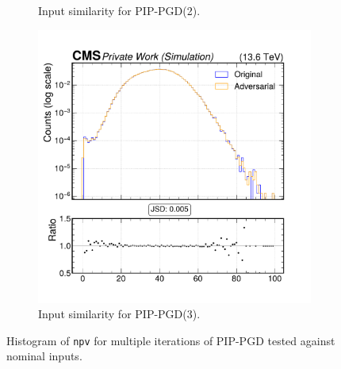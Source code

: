 \begin{figure}[htbp]
\begin{subfigure}[t]{0.32\textwidth}
    \caption*{Input similarity for PIP-PGD(2).}
  \end{subfigure}\hfill
  \begin{subfigure}[t]{0.32\textwidth}
    \includegraphics[width=\linewidth]{media/output/features/compare/combined_it_3/cmp_global_features_npv.pdf}
    \caption*{Input similarity for PIP-PGD(3).}
  \end{subfigure}

  \caption*{Histogram of \texttt{npv} for multiple iterations of PIP-PGD tested against nominal inputs.}
  \label{fig:combined_input_npv}
\end{figure}


